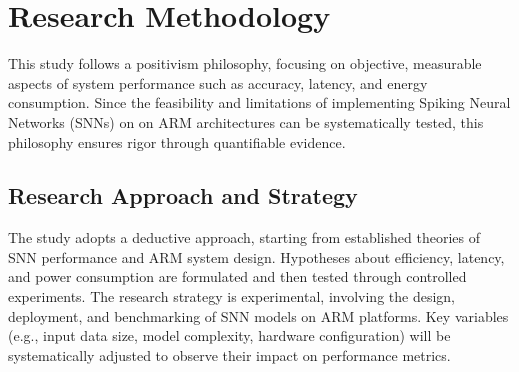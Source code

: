 \documentclass[a4paper,12pt]{article}
\begin{document}
	\section{Research Methodology}
	This study follows a positivism philosophy, focusing on objective, measurable aspects of system performance such as accuracy, latency, and energy consumption. Since the feasibility and limitations of implementing Spiking Neural Networks (SNNs) on on ARM architectures can be systematically tested, this philosophy ensures rigor through quantifiable evidence.
	
	\subsection{Research Approach and Strategy}
	The study adopts a deductive approach, starting from established theories of SNN performance and ARM system design. Hypotheses about efficiency, latency, and power consumption are formulated and then tested through controlled experiments. The research strategy is experimental, involving the design, deployment, and benchmarking of SNN models on ARM platforms. Key variables (e.g., input data size, model complexity, hardware configuration) will be systematically adjusted to observe their impact on performance metrics.
	
\end{document}

